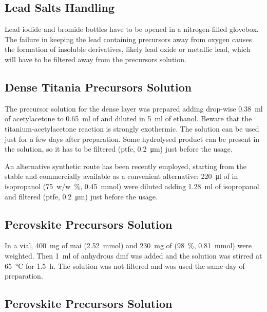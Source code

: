 	\subsection{Lead Salts Handling}

		Lead iodide and bromide bottles have to be opened in a nitrogen-filled glovebox.
		The failure in keeping the lead containing precursors away from oxygen causes the formation of insoluble derivatives, likely lead oxide or metallic lead, which will have to be filtered away from the precursors solution.

	\subsection{Dense Titania Precursors Solution}\label{precursors_tio2}

		The precursor solution for the dense  layer was prepared adding drop-wise \SI{0.38}{\ml} of acetylacetone to \SI{0.65}{\ml} of  and diluted in \SI{5}{\ml} of ethanol.
		Beware that the titanium-acetylacetone reaction is strongly exothermic.
		The solution can be used just for a few days after preparation.
		Some hydrolysed product can be present in the solution, so it has to be filtered (\gls{ptfe}, \SI{0.2}{\um}) just before the usage.

		An alternative synthetic route has been recently employed, starting from the stable and commercially available  as a convenient alternative: \SI{220}{\ul} of  in isopropanol (\SI{75}{w/w\%}, \SI{0.45}{\mmol}) were diluted adding \SI{1.28}{\ml} of isopropanol and filtered (\gls{ptfe}, \SI{0.2}{\um}) just before the usage.

	\subsection{ Perovskite Precursors Solution}\label{precursors_mapicl}

		In a vial, \SI{400}{\mg} of \gls{mai} (\SI{2.52}{\mmol}) and \SI{230}{\mg} of  (\SI{98}{\%}, \SI{0.81}{\mmol}) were weighted.
		Then \SI{1}{\ml} of anhydrous \gls{dmf} was added and the solution was stirred at \SI{65}{\celsius} for \SI{1.5}{\hour}.
		The solution was not filtered and was used the same day of preparation.

	\subsection{ Perovskite Precursors Solution}\label{precursors_csfamapbibr}

